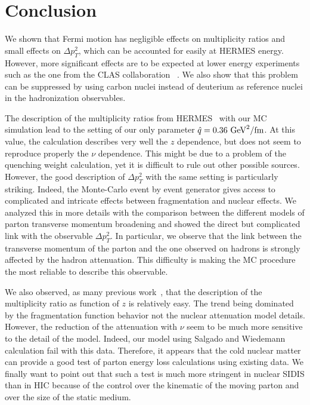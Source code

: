 \section{Conclusion}

We shown that Fermi motion has negligible effects on multiplicity ratios and 
small effects on $\Delta p_T^2$, which can be accounted for easily at HERMES 
energy. However, more significant effects are to be expected at lower energy 
experiments such as the one from the CLAS collaboration~%
\cite{Brooks:2009xg,DupreQNP}. We also show that this problem can be suppressed 
by using carbon nuclei instead of deuterium as reference nuclei in the 
hadronization observables. 

The description of the multiplicity ratios from HERMES~\cite{Airapetian:2007vu} 
with our MC simulation lead to the setting of our only parameter $\qhat = 0.36\ 
\text{GeV}^2/\text{fm}$. At this value, the calculation describes very well the 
$z$ dependence, but does not seem to reproduce properly the $\nu$ dependence. 
This might be due to a problem of the quenching weight calculation, yet it is 
difficult to rule out other possible sources. However, the good description of 
$\Delta p_T^2$ with the same setting is particularly striking. Indeed, the 
Monte-Carlo event by event generator gives access to complicated and intricate 
effects between fragmentation and nuclear effects. We analyzed this in more 
details with the comparison between the different models of parton transverse 
momentum broadening and showed the direct but complicated link with the 
observable $\Delta p_T^2$. In particular, we observe that the link between the 
transverse momentum of the parton and the one observed on hadrons is strongly 
affected by the hadron attenuation. This difficulty is making the MC procedure 
the most reliable to describe this observable. 

We also observed, as many previous work~\cite{Accardi:2009qv}, that the 
description of the multiplicity ratio as function of $z$ is relatively easy. 
The trend being dominated by the fragmentation function behavior not the 
nuclear attenuation model details. However, the reduction of the attenuation 
with $\nu$ seem to be much more sensitive to the detail of the model. Indeed, 
our model using Salgado and Wiedemann calculation fail with this data. 
Therefore, it appears that the cold nuclear matter can provide a good test of 
parton energy loss calculations using existing data. We finally want to point 
out that such a test is much more stringent in nuclear SIDIS than in HIC 
because of the control over the kinematic of the moving parton and over the 
size of the static medium.

